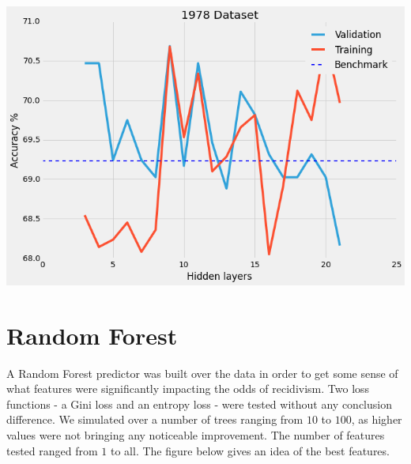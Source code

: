 \documentclass[a0,landscape]{a0poster}
\begin{document}
\begin{multicols}{4}
\begin{center}\vspace{1cm}
\includegraphics[width=0.9\linewidth]{1978}
\end{center}\vspace{1cm}


\section*{Random Forest}

A Random Forest predictor was built over the data in order to get some sense of what features were significantly impacting the odds of recidivism. Two loss functions - a Gini loss and an entropy loss - were tested without any conclusion difference. We simulated over a number of trees ranging from $10$ to $100$, as higher values were not bringing any noticeable improvement. The number of features tested ranged from $1$ to all. The figure below gives an idea of the best features.


\end{multicols}
\end{document}
